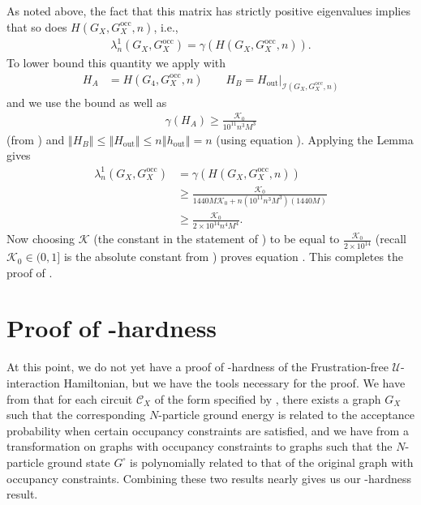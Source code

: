 \documentclass[../thesis-main/thesis-main]{subfiles}
\begin{document}
As noted above, the fact that this matrix has strictly positive eigenvalues implies that so does
$H(G_{X},G_X^{\text{occ}},n)$, i.e.,
\begin{align}
\lambda_{n}^{1}\left(G_{X},G_X^{\text{occ}}\right)=\gamma(H(G_{X},G_X^{\text{occ}},n)).
\end{align}
To lower bound this quantity we apply  with
\begin{align}
H_{A} &= H(G_{4},G_X^{\text{occ}},n)\qquad H_{B}=H_{{\text{out}}}\big|_{\mathcal{I}(G_{X},G_X^{\text{occ}},n)}
\end{align}
and we use the bound  as well as
\begin{align}
\gamma(H_{A}) \geq \frac{\mathcal{K}_0}{10^{11} n^{3}M^{3}}
\end{align}
(from ) and $\left\Vert H_{B}\right\Vert \leq\left\Vert H_{{\text{out}}}\right\Vert \leq n\left\Vert h_{{\text{out}}}\right\Vert=n$ (using equation ). Applying the Lemma gives
\begin{align}
\lambda_{n}^{1}\left(G_{X},G_X^{\text{occ}}\right)&=\gamma(H(G_{X},G_X^{\text{occ}},n))\\
&\geq \frac{\mathcal{K}_0}{1440M \mathcal{K}_0+n(10^{11}n^3M^3)(1440M)}\\
&\geq \frac{\mathcal{K}_0}{2\times10^{14}n^4M^4}.
\end{align}
Now choosing $\mathcal{K}$ (the constant in the statement of ) to be equal to $\frac{\mathcal{K}_0}{2\times10^{14}}$ (recall $\mathcal{K}_0\in (0,1]$ is the absolute constant from ) proves equation . This completes the proof of .

\section{Proof of \QMA-hardness}

At this point, we do not yet have a proof of \QMA-hardness of the Frustration-free $\mathcal{U}$-interaction Hamiltonian, but we have the tools necessary for the proof.  We have from  that for each circuit $\mathcal{C}_X$ of the form specified by , there exists a graph $G_X$ such that the corresponding $N$-particle ground energy is related to the acceptance probability when certain occupancy constraints are satisfied, and we have from  a transformation on graphs with occupancy constraints to graphs such that the $N$-particle ground state $G^\square$ is polynomially related to that of the original graph with occupancy constraints.  Combining these two results nearly gives us our \QMA-hardness result.
\end{document}

